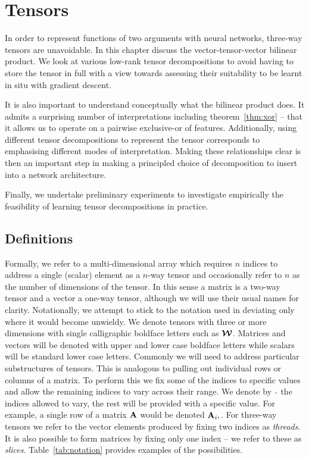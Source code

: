 
\chapter{Tensors}\label{C:tens}

In order to represent functions of two arguments with neural networks, three-way tensors are 
unavoidable. In this chapter discuss the vector-tensor-vector bilinear product. We look at various
low-rank tensor decompositions to avoid having to store the tensor in full with a view towards
assessing their suitability to be learnt in situ with gradient descent.

It is also important to understand conceptually what the bilinear product does. It admits a surprising
number of interpretations including theorem~\ref{thm:xor} -- that it allows us to operate on a
pairwise exclusive-or of features. Additionally, using different tensor decompositions to represent
the tensor corresponds to emphasising different modes of interpretation. Making these relationships
clear is then an important step in making a principled choice of decomposition to insert into a 
network architecture.

Finally, we undertake preliminary experiments to investigate empirically the feasibility of learning
tensor decompositions in practice.

\section{Definitions}
Formally, we refer to a multi-dimensional array which requires \(n\) indices to address a single
(scalar) element as a \(n\)-way tensor and occasionally refer to \(n\) as the number of dimensions of
the tensor. In this sense a matrix is a two-way tensor and a vector
a one-way tensor, although we will use their usual names for clarity. Notationally, we attempt to
stick to the notation used in \autocite{Kolda2009} deviating only where it would become unwieldy.
We denote tensors with three or more dimensions with single calligraphic boldface letters such
as \(\bm{\mathcal{W}}\). Matrices and vectors will be denoted with upper and lower case boldface letters
while scalars will be standard lower case letters. Commonly we will need to address particular
substructures of tensors. This is analogous to pulling out individual rows or columns of a matrix.
To perform this we fix some of the indices to specific values and allow the remaining indices to vary
across their range. We denote by \(\midbullet\) the indices allowed to vary, the rest will be provided
with a specific value. For example, a single row of a matrix \(\mathbf{A}\) would be denoted 
\(\mat{A}_{i\midbullet}\).
For three-way tensors we refer to the vector elements produced by fixing two indices as 
\emph{threads}. It is also possible to form matrices by fixing only one index -- we refer to these
as \emph{slices}. Table~\ref{tab:notation} provides examples of the possibilities.

